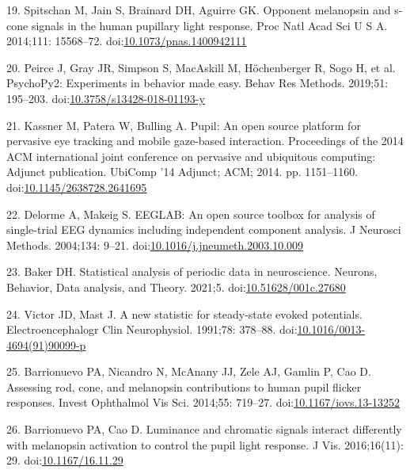 \documentclass[
]{article}
\begin{document}
\leavevmode\hypertarget{ref-Spitschan2014}{}%
19. Spitschan M, Jain S, Brainard DH, Aguirre GK. Opponent melanopsin and s-cone signals in the human pupillary light response. Proc Natl Acad Sci U S A. 2014;111: 15568--72. doi:\href{https://doi.org/10.1073/pnas.1400942111}{10.1073/pnas.1400942111}

\leavevmode\hypertarget{ref-Peirce2019}{}%
20. Peirce J, Gray JR, Simpson S, MacAskill M, Höchenberger R, Sogo H, et al. PsychoPy2: Experiments in behavior made easy. Behav Res Methods. 2019;51: 195--203. doi:\href{https://doi.org/10.3758/s13428-018-01193-y}{10.3758/s13428-018-01193-y}

\leavevmode\hypertarget{ref-Kassner2014}{}%
21. Kassner M, Patera W, Bulling A. Pupil: An open source platform for pervasive eye tracking and mobile gaze-based interaction. Proceedings of the 2014 ACM international joint conference on pervasive and ubiquitous computing: Adjunct publication. UbiComp '14 Adjunct; ACM; 2014. pp. 1151--1160. doi:\href{https://doi.org/10.1145/2638728.2641695}{10.1145/2638728.2641695}

\leavevmode\hypertarget{ref-Delorme2004}{}%
22. Delorme A, Makeig S. EEGLAB: An open source toolbox for analysis of single-trial EEG dynamics including independent component analysis. J Neurosci Methods. 2004;134: 9--21. doi:\href{https://doi.org/10.1016/j.jneumeth.2003.10.009}{10.1016/j.jneumeth.2003.10.009}

\leavevmode\hypertarget{ref-Baker2021}{}%
23. Baker DH. Statistical analysis of periodic data in neuroscience. Neurons, Behavior, Data analysis, and Theory. 2021;5. doi:\href{https://doi.org/10.51628/001c.27680}{10.51628/001c.27680}

\leavevmode\hypertarget{ref-Victor1991}{}%
24. Victor JD, Mast J. A new statistic for steady-state evoked potentials. Electroencephalogr Clin Neurophysiol. 1991;78: 378--88. doi:\href{https://doi.org/10.1016/0013-4694(91)90099-p}{10.1016/0013-4694(91)90099-p}

\leavevmode\hypertarget{ref-Barrionuevo2014}{}%
25. Barrionuevo PA, Nicandro N, McAnany JJ, Zele AJ, Gamlin P, Cao D. Assessing rod, cone, and melanopsin contributions to human pupil flicker responses. Invest Ophthalmol Vis Sci. 2014;55: 719--27. doi:\href{https://doi.org/10.1167/iovs.13-13252}{10.1167/iovs.13-13252}

\leavevmode\hypertarget{ref-Barrionuevo2016}{}%
26. Barrionuevo PA, Cao D. Luminance and chromatic signals interact differently with melanopsin activation to control the pupil light response. J Vis. 2016;16(11): 29. doi:\href{https://doi.org/10.1167/16.11.29}{10.1167/16.11.29}
\end{document}
